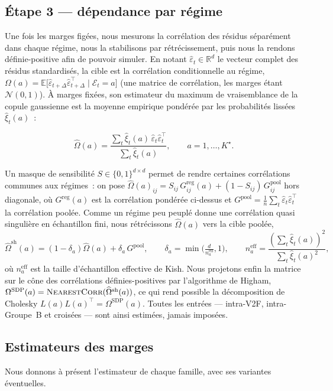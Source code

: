 \documentclass[11pt,a4paper]{article}
\theoremstyle{definition}
\newcommand{\R}{\mathbb{R}}
\newcommand{\E}{\mathbb{E}}
\newcommand{\Ecal}{\mathcal{E}}
\newcommand{\Ncal}{\mathcal{N}}
\newcommand{\eps}{\varepsilon}
\newcommand{\transp}{^{\!\top}}
\newcommand{\Dt}{\Delta}
\begin{document}
\subsection{Étape 3 --- dépendance par régime}
\label{sec:etape3}
Une fois les marges figées, nous mesurons la corrélation des résidus séparément dans chaque régime, nous la stabilisons par rétrécissement, puis nous la rendons définie-positive afin de pouvoir simuler. En notant $\widehat\eps_t\in\R^d$ le vecteur complet des résidus standardisés, la cible est la corrélation conditionnelle au régime, $\Omega(a)=\E\big[\widehat\eps_{t+\Dt}\widehat\eps_{t+\Dt}\transp\mid\Ecal_t=a\big]$ (une matrice de corrélation, les marges étant $\Ncal(0,1)$). À marges fixées, son estimateur du maximum de vraisemblance de la copule gaussienne est la moyenne empirique pondérée par les probabilités lissées $\hat\xi_t(a)$~:
\begin{definitionbox}
\[
\widehat\Omega(a)=\frac{\sum_t\hat\xi_t(a)\,\widehat\eps_t\widehat\eps_t\transp}{\sum_t\hat\xi_t(a)},\qquad a=1,\dots,K^\star .
\]
\end{definitionbox}
\noindent Un masque de sensibilité $S\in\{0,1\}^{d\times d}$ permet de rendre certaines corrélations communes aux régimes~: on pose $\widehat\Omega(a)_{ij}=S_{ij}\,G^{\mathrm{reg}}_{ij}(a)+(1-S_{ij})\,G^{\mathrm{pool}}_{ij}$ hors diagonale, où $G^{\mathrm{reg}}(a)$ est la corrélation pondérée ci-dessus et $G^{\mathrm{pool}}=\tfrac1n\sum_t\widehat\eps_t\widehat\eps_t\transp$ la corrélation poolée. Comme un régime peu peuplé donne une corrélation quasi singulière en échantillon fini, nous rétrécissons $\widehat\Omega(a)$ vers la cible poolée,
\[
\widehat\Omega^{\mathrm{sh}}(a)=(1-\delta_a)\widehat\Omega(a)+\delta_a\,G^{\mathrm{pool}},\qquad
\delta_a=\min\!\Big(\tfrac{d}{n^{\mathrm{eff}}_a},1\Big),\qquad
n^{\mathrm{eff}}_a=\frac{(\sum_t\hat\xi_t(a))^2}{\sum_t\hat\xi_t(a)^2},
\]
où $n^{\mathrm{eff}}_a$ est la taille d'échantillon effective de Kish. Nous projetons enfin la matrice sur le cône des corrélations définies-positives par l'algorithme de Higham, $\Omega^{\mathrm{SDP}}(a)=\textsc{NearestCorr}(\widehat\Omega^{\mathrm{sh}}(a))$, ce qui rend possible la décomposition de Cholesky $L(a)L(a)\transp=\Omega^{\mathrm{SDP}}(a)$. Toutes les entrées --- intra-V2F, intra-Groupe~B et croisées --- sont ainsi estimées, jamais imposées.

\subsection{Estimateurs des marges}
\label{sec:closed}
Nous donnons à présent l'estimateur de chaque famille, avec ses variantes éventuelles.
\end{document}

